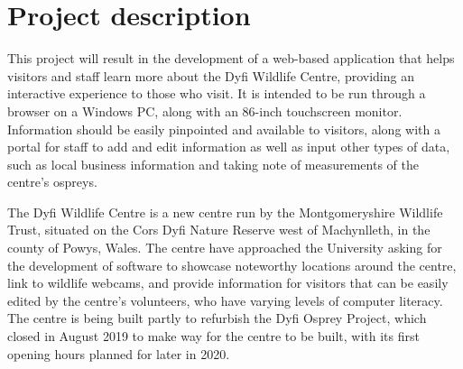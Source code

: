 \documentclass[11pt,fleqn,twoside]{article}
\begin{document}

\mmp



\section{Project description}
This project will result in the development of a web-based application that helps visitors and staff learn more about the Dyfi Wildlife Centre, providing an interactive experience to those who visit. It is intended to be run through a browser on a Windows PC, along with an 86-inch touchscreen monitor. Information should be easily pinpointed and available to visitors, along with a portal for staff to add and edit information as well as input other types of data, such as local business information and taking note of measurements of the centre's ospreys.

The Dyfi Wildlife Centre is a new centre run by the Montgomeryshire Wildlife Trust, situated on the Cors Dyfi Nature Reserve west of Machynlleth, in the county of Powys, Wales. The centre have approached the University asking for the development of software to showcase noteworthy locations around the centre, link to wildlife webcams, and provide information for visitors that can be easily edited by the centre's volunteers, who have varying levels of computer literacy. The centre is being built partly to refurbish the Dyfi Osprey Project, which closed in August 2019 to make way for the centre to be built, with its first opening hours planned for later in 2020\cite{DyfiWildlifeCentre}.
\end{document}
